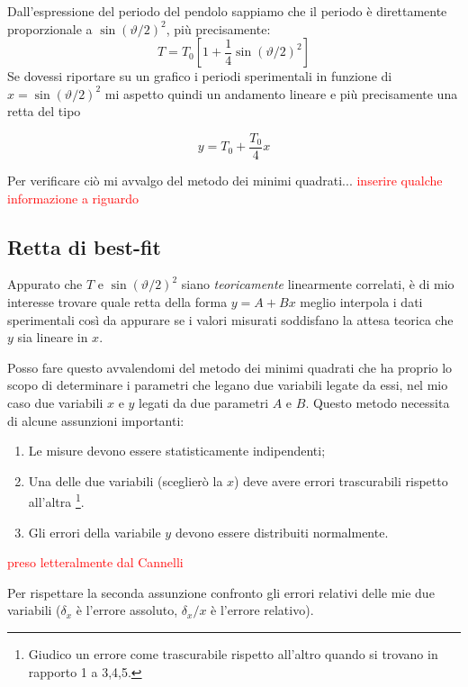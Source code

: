 \documentclass{article}
\begin{document}
\noindent
Dall'espressione del periodo del pendolo sappiamo che il periodo è direttamente proporzionale a $\sin\left(\vartheta/2\right)^2$, più precisamente:
\[
T = T_0 \left[ 1 + \frac{1}{4}\sin{\left(\vartheta/2\right)}^2 \right]
\]
Se dovessi riportare su un grafico i periodi sperimentali in funzione di $x = \sin{\left(\vartheta/2\right)}^2$ mi aspetto quindi un andamento lineare e più precisamente una retta del tipo

\[
y = T_0 + \frac{T_0}{4}x
\]

\noindent
Per verificare ciò mi avvalgo del metodo dei minimi quadrati...
\textcolor{red}{inserire qualche informazione a riguardo}

\newpage
\subsection{Retta di best-fit}
Appurato che $T$ e $\sin{\left(\vartheta/2\right)}^2$ siano \textit{teoricamente} linearmente correlati, è di mio interesse trovare quale retta della forma $y = A + Bx$ meglio interpola i dati sperimentali così da appurare se i valori misurati soddisfano la attesa teorica che $y$ sia lineare in $x$. 

Posso fare questo avvalendomi del metodo dei minimi quadrati che ha  proprio lo scopo di determinare i parametri che legano due variabili legate da essi, nel mio caso due variabili $x$ e $y$ legati da due parametri $A$ e $B$. Questo metodo necessita di alcune assunzioni importanti: 

\begin{enumerate}
	\item Le misure devono essere statisticamente indipendenti;
	\item Una delle due variabili (sceglierò la $x$) deve avere errori trascurabili rispetto all'altra \footnote{Giudico un errore come trascurabile rispetto all'altro quando si trovano in rapporto 1 a 3,4,5.}.
	\item Gli errori della variabile $y$ devono essere distribuiti normalmente.
\end{enumerate}
\textcolor{red}{preso letteralmente dal Cannelli}

\noindent
Per rispettare la seconda assunzione confronto gli errori relativi delle mie due variabili ($\delta_x$ è l'errore assoluto, $\delta_x/x$ è l'errore relativo).
\end{document}
